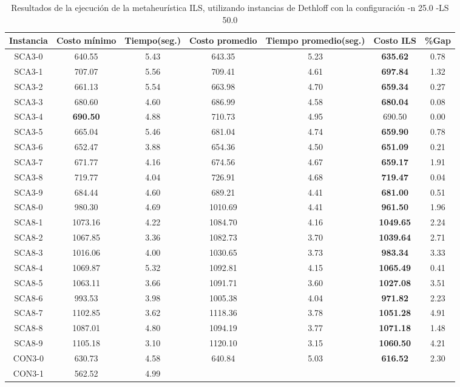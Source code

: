 \begin{table}[ht]
\caption{Resultados de la ejecución de la metaheurística ILS, utilizando instancias de Dethloff con la configuración -n 25.0 -LS 50.0}
\centering
\small
\begin{tabular}{c c c c c c c}
\hline\hline
Instancia & Costo mínimo & Tiempo(seg.) & Costo promedio & Tiempo promedio(seg.) & Costo ILS & \%Gap \\ [0.5ex]
\hline
SCA3-0 & 640.55 & 5.43 & 
643.35 & 5.23 & \bf{635.62} & 
0.78\\SCA3-1 & 707.07 & 5.56 & 
709.41 & 4.61 & \bf{697.84} & 
1.32\\SCA3-2 & 661.13 & 5.54 & 
663.98 & 4.70 & \bf{659.34} & 
0.27\\SCA3-3 & 680.60 & 4.60 & 
686.99 & 4.58 & \bf{680.04} & 
0.08\\SCA3-4 & \bf{690.50} & 4.88 & 
710.73 & 4.95 & 690.50 & 0.00\\
SCA3-5 & 665.04 & 5.46 & 
681.04 & 4.74 & \bf{659.90} & 
0.78\\SCA3-6 & 652.47 & 3.88 & 
654.36 & 4.50 & \bf{651.09} & 
0.21\\SCA3-7 & 671.77 & 4.16 & 
674.56 & 4.67 & \bf{659.17} & 
1.91\\SCA3-8 & 719.77 & 4.04 & 
726.91 & 4.68 & \bf{719.47} & 
0.04\\SCA3-9 & 684.44 & 4.60 & 
689.21 & 4.41 & \bf{681.00} & 
0.51\\SCA8-0 & 980.30 & 4.69 & 
1010.69 & 4.41 & \bf{961.50} & 
1.96\\SCA8-1 & 1073.16 & 4.22 & 
1084.70 & 4.16 & \bf{1049.65} & 
2.24\\SCA8-2 & 1067.85 & 3.36 & 
1082.73 & 3.70 & \bf{1039.64} & 
2.71\\SCA8-3 & 1016.06 & 4.00 & 
1030.65 & 3.73 & \bf{983.34} & 
3.33\\SCA8-4 & 1069.87 & 5.32 & 
1092.81 & 4.15 & \bf{1065.49} & 
0.41\\SCA8-5 & 1063.11 & 3.66 & 
1091.71 & 3.60 & \bf{1027.08} & 
3.51\\SCA8-6 & 993.53 & 3.98 & 
1005.38 & 4.04 & \bf{971.82} & 
2.23\\SCA8-7 & 1102.85 & 3.62 & 
1118.36 & 3.78 & \bf{1051.28} & 
4.91\\SCA8-8 & 1087.01 & 4.80 & 
1094.19 & 3.77 & \bf{1071.18} & 
1.48\\SCA8-9 & 1105.18 & 3.10 & 
1120.10 & 3.15 & \bf{1060.50} & 
4.21\\CON3-0 & 630.73 & 4.58 & 
640.84 & 5.03 & \bf{616.52} & 
2.30\\CON3-1 & 562.52 & 4.99 & 

\end{tabular}
\end{table}
